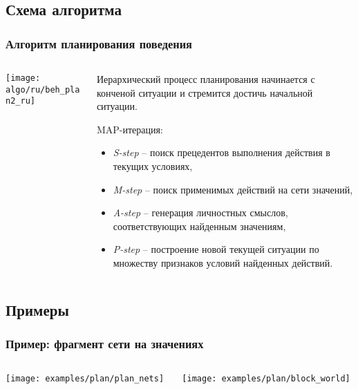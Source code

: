\documentclass[default]{beamer}
\begin{document}
	\subsection{Схема алгоритма}
	\begin{frame}
		\frametitle{Алгоритм планирования поведения}
		
		\begin{columns}
			\begin{column}{0.6\textwidth}
				\texttt{[image: algo/ru/beh\_plan2\_ru]}
				\vspace{10pt}
				\nocite{*}
				\printbibliography[keyword={plan}, resetnumbers=true]
				\printbibliography[keyword={causnet}]
			\end{column}
			\begin{column}{0.4\textwidth}
				\scriptsize
				Иерархический процесс планирования начинается с конченой ситуации и стремится достичь начальной ситуации.
				\par\bigskip
				MAP-итерация:
				\begin{itemize}
					\item \textit{S-step} -- поиск прецедентов выполнения действия в текущих условиях,
					\item \textit{M-step} -- поиск применимых действий на сети значений,
					\item \textit{A-step} -- генерация личностных смыслов, соответствующих найденным значениям,
					\item \textit{P-step} -- построение новой текущей ситуации по множеству признаков условий найденных действий.
					
				\end{itemize}
			\end{column}
		\end{columns}
		
	\end{frame}		
	
	\subsection{Примеры}
	\begin{frame}
		\frametitle{Пример: фрагмент сети на значениях}
		\begin{columns}
			\begin{column}{0.7\textwidth}
				\centering
				\texttt{[image: examples/plan/plan\_nets]}
			\end{column}
			\begin{column}{0.3\textwidth}
				\centering
				\texttt{[image: examples/plan/block\_world]}
			\end{column}
		\end{columns}
	\end{frame}	
	
\end{document}
